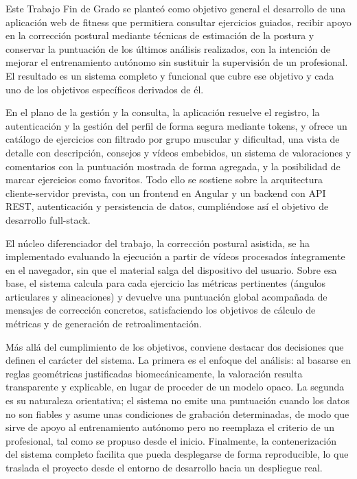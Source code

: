 \documentclass[12pt,a4paper,twoside,openright]{book}
\begin{document}
    Este Trabajo Fin de Grado se planteó como objetivo general el desarrollo de
    una aplicación web de fitness que permitiera consultar ejercicios guiados,
    recibir apoyo en la corrección postural mediante técnicas de estimación de
    la postura y conservar la puntuación de los últimos análisis realizados, con
    la intención de mejorar el entrenamiento autónomo sin sustituir la
    supervisión de un profesional. El resultado es un sistema completo y funcional que cubre ese objetivo y
    cada uno de los objetivos específicos derivados de él.

    En el plano de la gestión y la consulta, la aplicación resuelve el registro,
    la autenticación y la gestión del perfil de forma segura mediante tokens, y
    ofrece un catálogo de ejercicios con filtrado por grupo muscular y
    dificultad, una vista de detalle con descripción, consejos y vídeos
    embebidos, un sistema de valoraciones y comentarios con la puntuación
    mostrada de forma agregada, y la posibilidad de marcar ejercicios como
    favoritos. Todo ello se sostiene sobre la arquitectura cliente-servidor
    prevista, con un frontend en Angular y un backend con API REST,
    autenticación y persistencia de datos, cumpliéndose así el objetivo de
    desarrollo full-stack.

    El núcleo diferenciador del trabajo, la corrección postural asistida, se ha
    implementado evaluando la ejecución a partir de vídeos procesados
    íntegramente en el navegador, sin que el material salga del dispositivo del
    usuario. Sobre esa base, el sistema calcula para cada ejercicio las métricas
    pertinentes (ángulos articulares y alineaciones) y devuelve una puntuación
    global acompañada de mensajes de corrección concretos, satisfaciendo los
    objetivos de cálculo de métricas y de generación de retroalimentación.

    Más allá del cumplimiento de los objetivos, conviene destacar dos decisiones
    que definen el carácter del sistema. La primera es el enfoque del análisis:
    al basarse en reglas geométricas justificadas biomecánicamente, la
    valoración resulta transparente y explicable, en lugar de proceder de un
    modelo opaco. La segunda es su naturaleza orientativa; el sistema no emite
    una puntuación cuando los datos no son fiables y asume unas condiciones de
    grabación determinadas, de modo que sirve de apoyo al entrenamiento autónomo
    pero no reemplaza el criterio de un profesional, tal como se propuso desde el
    inicio. Finalmente, la contenerización del sistema completo facilita que
    pueda desplegarse de forma reproducible, lo que traslada el proyecto desde el
    entorno de desarrollo hacia un despliegue real.
\end{document}
